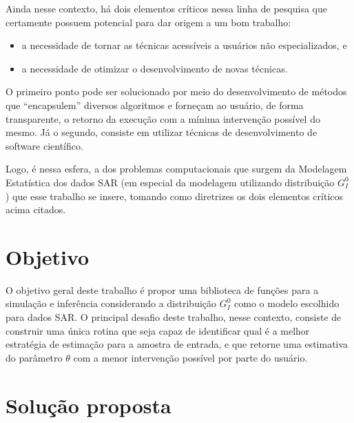 Ainda nesse contexto, há dois elementos críticos nessa linha de pesquisa que certamente possuem potencial para dar origem a um bom trabalho:
\begin{itemize}
\item a necessidade de tornar as técnicas acessíveis a usuários não especializados, e
\item a necessidade de otimizar o desenvolvimento de novas técnicas.
\end{itemize}

O primeiro ponto pode ser solucionado por meio do desenvolvimento de métodos que ``encapsulem'' diversos algoritmos e forneçam ao usuário, de forma transparente, o retorno da execução com a mínima intervenção possível do mesmo. 
Já o segundo, consiste em utilizar técnicas de desenvolvimento de software científico.

Logo, é nessa esfera, a dos problemas computacionais que surgem da Modelagem Estatística dos dados SAR (em especial da modelagem utilizando distribuição $G_I^0$) que esse trabalho se insere, tomando como diretrizes os dois elementos críticos acima citados.

\section{Objetivo}

O objetivo geral deste trabalho é propor uma biblioteca de funções para a simulação e inferência considerando a distribuição $G_I^{0}$ como o modelo escolhido para dados SAR. 
O principal desafio deste trabalho, nesse contexto, consiste de construir uma única rotina que seja capaz de identificar qual é a melhor estratégia de estimação para a amostra de entrada, e que retorne uma estimativa do parâmetro $\theta$ com a menor intervenção possível por parte do usuário.

\section{Solução proposta}

